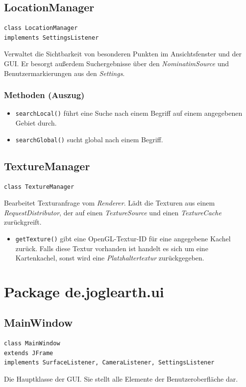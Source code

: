 \documentclass[10pt]{scrreprt}
\begin{document}
\vspace{5mm}
\subsection*{LocationManager}
\begin{lstlisting}
class LocationManager
implements SettingsListener
\end{lstlisting}
Verwaltet die Sichtbarkeit von besonderen Punkten im Ansichtsfenster und der GUI. Er besorgt außerdem Suchergebnisse über den \textit{NominatimSource} und Benutzermarkierungen aus den \textit{Settings}.\\
\subsubsection*{Methoden (Auszug)}
\begin{itemize}
\item \texttt{searchLocal()} führt eine Suche nach einem Begriff auf einem angegebenen Gebiet durch.
\item \texttt{searchGlobal()} sucht global nach einem Begriff.
\end{itemize}

\vspace{5mm}
\subsection*{TextureManager}
\begin{lstlisting}
class TextureManager
\end{lstlisting}
Bearbeitet Texturanfrage vom \textit{Renderer}. Lädt die Texturen aus einem \textit{RequestDistributor}, der auf einen \textit{TextureSource} und einen \textit{TextureCache} zurückgreift.\\
\begin{itemize}
\item\texttt{getTexture()} gibt eine OpenGL-Textur-ID für eine angegebene Kachel zurück. Falls diese Textur vorhanden ist handelt es sich um eine Kartenkachel, sonst wird eine \textit{Platzhaltertextur} zurückgegeben.
\end{itemize}




\vspace{5mm}
\section{Package de.joglearth.ui}
\subsection*{MainWindow}
\begin{lstlisting}
class MainWindow
extends JFrame
implements SurfaceListener, CameraListener, SettingsListener
\end{lstlisting}
Die Hauptklasse der GUI. Sie stellt alle Elemente der Benutzeroberfläche dar.
\end{document}
